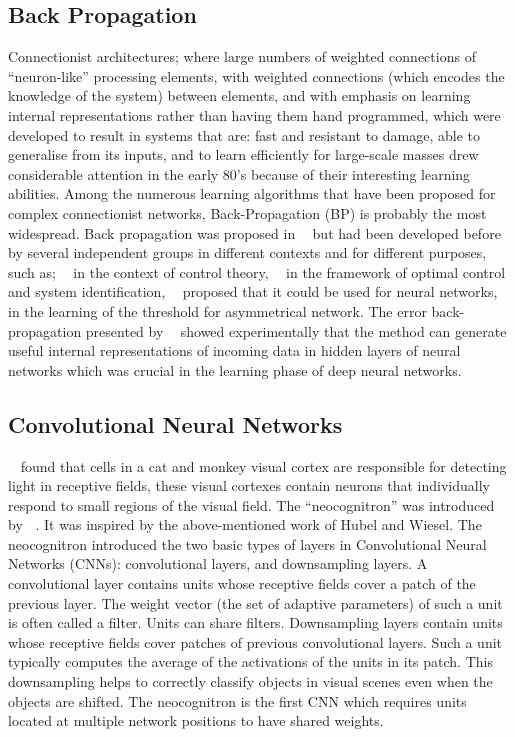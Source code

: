 \documentclass[12pt]{report}
\numberwithin{equation}{section}
\begin{document}
\subsection{Back Propagation}
Connectionist architectures; where large numbers of weighted connections of ``neuron-like'' processing elements, with weighted connections (which encodes the knowledge of the system) between elements, and with emphasis on learning internal representations rather than having them hand programmed, which were developed to result in systems that are: fast and resistant to damage, able to generalise from its inputs, and to learn efficiently for large-scale masses drew considerable attention in the early 80's because of their interesting learning abilities. Among the numerous learning algorithms that have been proposed for complex connectionist networks, Back-Propagation (BP) is probably the most widespread. Back propagation was proposed in \textbf{~\cite{RumelhartHintonWilliams86}} but had been developed before by several independent groups in different contexts and for different purposes, such as; \textbf{~\cite{Kelley:1960}} in the context of control theory, \textbf{~\cite{BrysonHo69}} in the framework of optimal control and system identification, \textbf{~\cite{Werbos:74}} proposed that it could be used for neural networks, \textbf{~\cite{7fa6b6a5cde14bcfbd7ab3a8f19d0d56}} in the learning of the threshold for asymmetrical network. The error back-propagation presented by \textbf{~\cite{RumelhartHintonWilliams86}} showed experimentally that the method can generate useful internal representations of incoming data in hidden layers of neural networks which was crucial in the learning phase of deep neural networks.

\subsection{Convolutional Neural Networks}
\textbf{~\cite{Hubel:62}} found that cells in a cat and monkey visual cortex are responsible for detecting light in receptive fields, these visual cortexes contain neurons that individually respond to small regions of the visual field. The ``neocognitron'' was introduced by \textbf{~\cite{fukushima:neocognitronbc}}. It was inspired by the above-mentioned work of Hubel and Wiesel. The neocognitron introduced the two basic types of layers in Convolutional Neural Networks (CNNs): convolutional layers, and downsampling layers. A convolutional layer contains units whose receptive fields cover a patch of the previous layer. The weight vector (the set of adaptive parameters) of such a unit is often called a filter. Units can share filters. Downsampling layers contain units whose receptive fields cover patches of previous convolutional layers. Such a unit typically computes the average of the activations of the units in its patch. This downsampling helps to correctly classify objects in visual scenes even when the objects are shifted. The neocognitron is the first CNN which requires units located at multiple network positions to have shared weights. 
\end{document}
